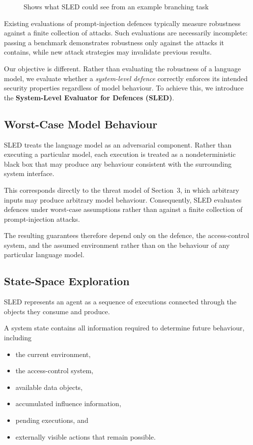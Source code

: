 \documentclass{article} %
\begin{document}
\begin{figure}
  
  \caption{Shows what SLED could see from an example branching task}
\end{figure}

Existing evaluations of prompt-injection defences typically measure robustness against a finite collection of attacks. Such evaluations are necessarily incomplete: passing a benchmark demonstrates robustness only against the attacks it contains, while new attack strategies may invalidate previous results.

Our objective is different. Rather than evaluating the robustness of a language model, we evaluate whether a \emph{system-level defence} correctly enforces its intended security properties regardless of model behaviour. To achieve this, we introduce the \textbf{System-Level Evaluator for Defences (SLED)}.

\subsection{Worst-Case Model Behaviour}

SLED treats the language model as an adversarial component. Rather than executing a particular model, each execution is treated as a nondeterministic black box that may produce any behaviour consistent with the surrounding system interface.

This corresponds directly to the threat model of Section~3, in which arbitrary inputs may produce arbitrary model behaviour. Consequently, SLED evaluates defences under worst-case assumptions rather than against a finite collection of prompt-injection attacks.

The resulting guarantees therefore depend only on the defence, the access-control system, and the assumed environment rather than on the behaviour of any particular language model.

\subsection{State-Space Exploration}

SLED represents an agent as a sequence of executions connected through the objects they consume and produce.

A system state contains all information required to determine future behaviour, including

\begin{itemize}
    \item the current environment,
    \item the access-control system,
    \item available data objects,
    \item accumulated influence information,
    \item pending executions, and
    \item externally visible actions that remain possible.
\end{itemize}
\end{document}
